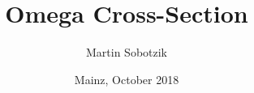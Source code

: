 \documentclass[
		10pt
		]{beamer}
\title[$\omega$ Cross-Section Studiesu A2] %
			{Omega Cross-Section} %
\subtitle{}
\date{Mainz, October 2018}
\author{Martin Sobotzik}
\institute[JGU Mainz]{
	Institute for Nuclear Physics\\ 
	Johannes Gutenberg University of Mainz\\ 
}
\begin{document}
\maketitle

\end{document}
